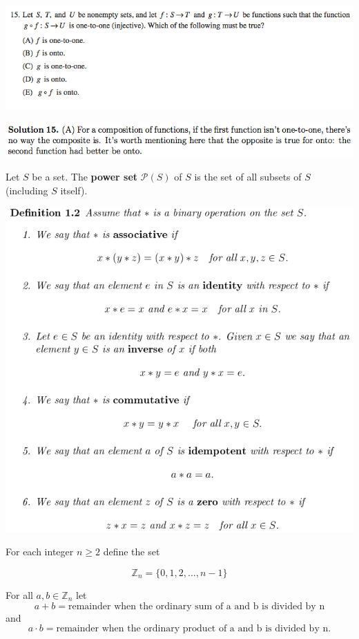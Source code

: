 \documentclass{article}
\begin{document}
\includegraphics[scale=0.65]{1268_15}

\includegraphics[scale=0.65]{1268_15s}

Let \(S\) be a set. The \textbf{power set} \(\mathcal{P}(S)\) of \(S\) is the set of all subsets of \(S\) (including \(S\) itself).

\includegraphics[scale=0.45]{binary_operation2}

\pagebreak

For each integer \(n \geq 2\) define the set

\[
\mathbb{Z}_n = \{0, 1, 2, \ldots, n-1\}
\]

For all \(a, b \in \mathbb{Z}_n\) let \[a + b = \text{remainder when the ordinary sum of a and b is divided by n}\] and \[a \cdot b = \text{remainder when the ordinary product of a and b is divided by n.}\]
\end{document}
